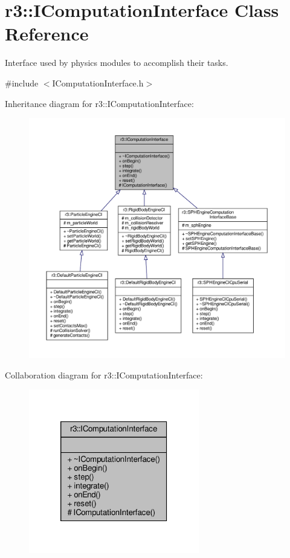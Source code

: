 \hypertarget{classr3_1_1_i_computation_interface}{}\section{r3\+:\+:I\+Computation\+Interface Class Reference}
\label{classr3_1_1_i_computation_interface}


Interface used by physics modules to accomplish their tasks.  




{\ttfamily \#include $<$I\+Computation\+Interface.\+h$>$}



Inheritance diagram for r3\+:\+:I\+Computation\+Interface\+:\nopagebreak
\begin{figure}[H]
\begin{center}
\leavevmode
\includegraphics[width=350pt]{classr3_1_1_i_computation_interface__inherit__graph}
\end{center}
\end{figure}


Collaboration diagram for r3\+:\+:I\+Computation\+Interface\+:\nopagebreak
\begin{figure}[H]
\begin{center}
\leavevmode
\includegraphics[width=211pt]{classr3_1_1_i_computation_interface__coll__graph}
\end{center}
\end{figure}
